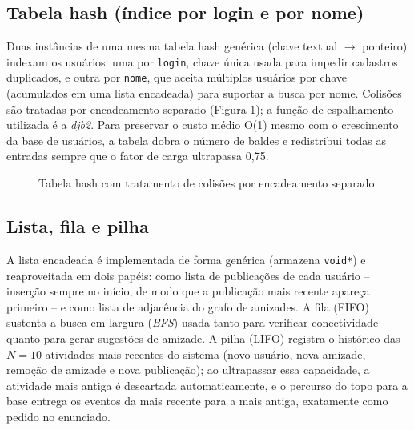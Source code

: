 \documentclass[
	12pt,				%
	oneside,			%
	a4paper,			%
	chapter=TITLE,		%
	brazil,				%
	]{abntex2}
\providecommand{\legend}[1]{\par\vspace{-0.4\baselineskip}{\footnotesize #1\par}\vspace{0.2cm}}
\begin{document}
\subsection{Tabela hash (índice por login e por nome)}

Duas instâncias de uma mesma tabela hash genérica (chave textual $\to$
ponteiro) indexam os usuários: uma por \texttt{login}, chave única usada
para impedir cadastros duplicados, e outra por \texttt{nome}, que aceita
múltiplos usuários por chave (acumulados em uma lista encadeada) para
suportar a busca por nome. Colisões são tratadas por encadeamento separado
(Figura \ref{fig:hash}); a função de espalhamento utilizada é a
\emph{djb2}. Para preservar o custo médio O(1) mesmo com o crescimento da
base de usuários, a tabela dobra o número de baldes e redistribui todas as
entradas sempre que o fator de carga ultrapassa 0,75.

\begin{figure}[htb]
\centering
{}
\caption{Tabela hash com tratamento de colisões por encadeamento separado}
\label{fig:hash}
\legend{Fonte: elaborado pelos autores. Baldes 0 e 1 vazios; balde 2 com
colisão de duas chaves distintas.}
\end{figure}

\subsection{Lista, fila e pilha}

A lista encadeada é implementada de forma genérica (armazena
\texttt{void*}) e reaproveitada em dois papéis: como lista de publicações
de cada usuário -- inserção sempre no início, de modo que a publicação
mais recente apareça primeiro -- e como lista de adjacência do grafo de
amizades. A fila (FIFO) sustenta a busca em largura (\emph{BFS}) usada
tanto para verificar conectividade quanto para gerar sugestões de amizade.
A pilha (LIFO) registra o histórico das $N=10$ atividades mais recentes do
sistema (novo usuário, nova amizade, remoção de amizade e nova
publicação); ao ultrapassar essa capacidade, a atividade mais antiga é
descartada automaticamente, e o percurso do topo para a base entrega os
eventos da mais recente para a mais antiga, exatamente como pedido no
enunciado.
\end{document}
